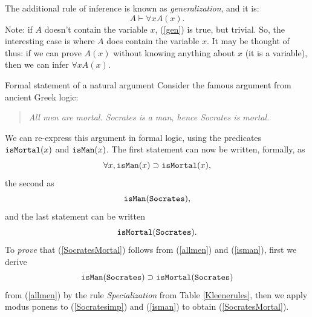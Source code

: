 The additional rule of inference is known as {\em generalization}, and it is:
\begin{equation}\label{gen}
A \vdash \forall x A(x).
\end{equation}
Note: if $A$ doesn't contain the variable $x$, (\ref{gen}) is true, but trivial. So, the interesting
case is where $A$ does contain the variable $x$. It may be thought of thus: if we can prove $A(x)$ without
knowing anything about $x$ (it is a variable), then we can infer $\forall xA(x)$.

\begin{example}{Formal statement of a natural argument}%
Consider the famous argument from ancient Greek logic:
\begin{quote}\em
All men are mortal. Socrates is a man, hence Socrates is mortal.
\end{quote}
We can re-express this argument in formal logic, using the predicates
${\tt isMortal}(x)$ and ${\tt isMan}(x)$. The first statement
can now be written, formally, as
\begin{equation}\label{allmen}
\forall x, {\tt isMan}(x) \supset {\tt isMortal}(x),
\end{equation}
the second as 
\begin{equation}\label{isman}
	{\tt isMan}({\tt Socrates}),
\end{equation}
and the last statement can be written
\begin{equation}\label{SocratesMortal}
	{\tt isMortal}({\tt Socrates}).
\end{equation}
To {\em prove} that (\ref{SocratesMortal}) follows from (\ref{allmen}) and (\ref{isman}),
first we derive 
\begin{equation}\label{Socratesimp}
	{\tt isMan}({\tt Socrates}) \supset {\tt isMortal}({\tt Socrates})
\end{equation}
from (\ref{allmen}) by the rule {\em Specialization} from Table \ref{Kleenerules}, then we apply modus ponens to 
	(\ref{Socratesimp}) and (\ref{isman}) to obtain (\ref{SocratesMortal}).
\end{example}

